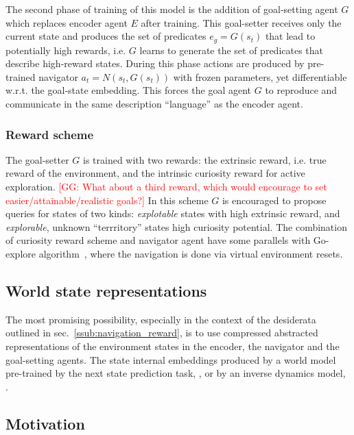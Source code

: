 \documentclass{article}
\newcommand{\GG}[1]{\textcolor{red}{[GG: #1]}}
\begin{document}
The second phase of training of this model is the addition of goal-setting agent $G$ which replaces encoder agent $E$ after training.
%
This goal-setter receives only the current state and produces the set of predicates $e_g = G(s_t)$ that lead to potentially high rewards, i.e. $G$ learns to generate the set of predicates that describe high-reward states. During this phase actions are produced by pre-trained navigator $a_t = N(s_t, G(s_t))$ with frozen parameters, yet differentiable w.r.t. the goal-state embedding. This forces the goal agent $G$ to reproduce and communicate in the same description ``language'' as the encoder agent.


\subsubsection{Reward scheme}

The goal-setter $G$ is trained with two rewards: the extrinsic reward, i.e. true reward of the environment, and the intrinsic curiosity reward\textbf{} for active exploration.
% 
\GG{What about a third reward, which would encourage to set easier/attainable/realistic goals?}
%
In this scheme $G$ is encouraged to propose queries for states of two kinds: \emph{explotable} states with high extrinsic reward, and \emph{explorable}, unknown ``terrritory'' states high curiosity potential.
%
The combination of curiosity reward scheme and navigator agent have some parallels with Go-explore algorithm~\citep{ecoffet_first_2021}, where the navigation is done via virtual environment resets.


\subsection{World state representations}

The most promising possibility, especially in the context of the desiderata outlined in sec.~\ref{ssub:navigation_reward}, is to use compressed abstracted representations of the environment states in the encoder, the navigator and the goal-setting agents. The state internal embeddings produced by a world model pre-trained by the next state prediction task, \citep{ha_recurrent_2018}, or by an inverse dynamics model, \citep{badia_never_2020}.


\subsection{Motivation}
\end{document}
